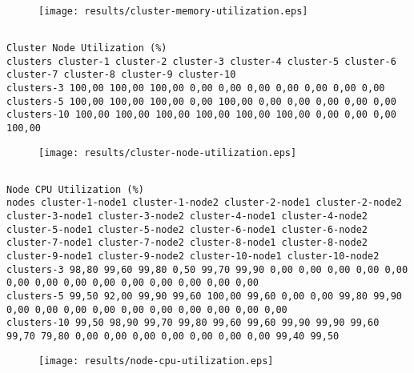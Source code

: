 \documentclass{elsart}
\begin{document}
\begin{figure}[ht]
\centering
\texttt{[image: results/cluster-memory-utilization.eps]}
\caption{}\label{fig:cluster-memory-utilization.eps}
\end{figure}

\subsection{}

\begin{lstlisting}[caption={}]
Cluster Node Utilization (%)
clusters cluster-1 cluster-2 cluster-3 cluster-4 cluster-5 cluster-6 cluster-7 cluster-8 cluster-9 cluster-10
clusters-3 100,00 100,00 100,00 0,00 0,00 0,00 0,00 0,00 0,00 0,00
clusters-5 100,00 100,00 100,00 0,00 100,00 0,00 0,00 0,00 0,00 0,00
clusters-10 100,00 100,00 100,00 100,00 100,00 100,00 0,00 0,00 0,00 100,00
\end{lstlisting}

\begin{figure}[ht]
\centering
\texttt{[image: results/cluster-node-utilization.eps]}
\caption{}\label{fig:cluster-node-utilization.eps}
\end{figure}

\subsection{}

\begin{lstlisting}[caption={}]
Node CPU Utilization (%)
nodes cluster-1-node1 cluster-1-node2 cluster-2-node1 cluster-2-node2 cluster-3-node1 cluster-3-node2 cluster-4-node1 cluster-4-node2 cluster-5-node1 cluster-5-node2 cluster-6-node1 cluster-6-node2 cluster-7-node1 cluster-7-node2 cluster-8-node1 cluster-8-node2 cluster-9-node1 cluster-9-node2 cluster-10-node1 cluster-10-node2
clusters-3 98,80 99,60 99,80 0,50 99,70 99,90 0,00 0,00 0,00 0,00 0,00 0,00 0,00 0,00 0,00 0,00 0,00 0,00 0,00 0,00
clusters-5 99,50 92,00 99,90 99,60 100,00 99,60 0,00 0,00 99,80 99,90 0,00 0,00 0,00 0,00 0,00 0,00 0,00 0,00 0,00 0,00
clusters-10 99,50 98,90 99,70 99,80 99,60 99,60 99,90 99,90 99,60 99,70 79,80 0,00 0,00 0,00 0,00 0,00 0,00 0,00 99,40 99,50
\end{lstlisting}

\begin{figure}[ht]
\centering
\texttt{[image: results/node-cpu-utilization.eps]}
\caption{}\label{fig:node-cpu-utilization.eps}
\end{figure}
\end{document}
